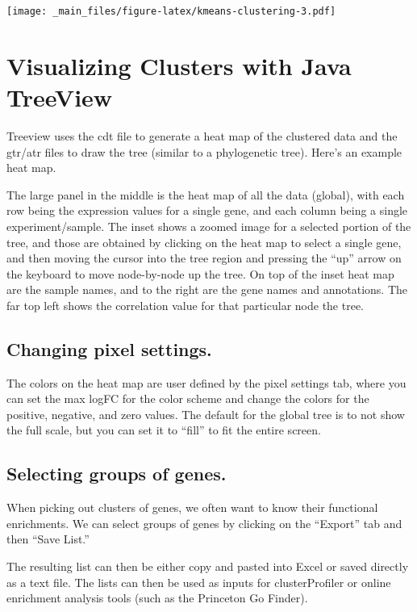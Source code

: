 \documentclass[
]{book}
\begin{document}
\texttt{[image: \_main\_files/figure-latex/kmeans-clustering-3.pdf]}

\hypertarget{visualizing-clusters-with-java-treeview}{%
\section{Visualizing Clusters with Java TreeView}\label{visualizing-clusters-with-java-treeview}}

Treeview uses the cdt file to generate a heat map of the clustered data and the gtr/atr files to draw the tree (similar to a phylogenetic tree). Here's an example heat map.

The large panel in the middle is the heat map of all the data (global), with each row being the expression values for a single gene, and each column being a single experiment/sample. The inset shows a zoomed image for a selected portion of the tree, and those are obtained by clicking on the heat map to select a single gene, and then moving the cursor into the tree region and pressing the ``up'' arrow on the keyboard to move node-by-node up the tree. On top of the inset heat map are the sample names, and to the right are the gene names and annotations. The far top left shows the correlation value for that particular node the tree.

\hypertarget{changing-pixel-settings.}{%
\subsection{Changing pixel settings.}\label{changing-pixel-settings.}}

The colors on the heat map are user defined by the pixel settings tab, where you can set the max logFC for the color scheme and change the colors for the positive, negative, and zero values. The default for the global tree is to not show the full scale, but you can set it to ``fill'' to fit the entire screen.

\hypertarget{selecting-groups-of-genes.}{%
\subsection{Selecting groups of genes.}\label{selecting-groups-of-genes.}}

When picking out clusters of genes, we often want to know their functional enrichments. We can select groups of genes by clicking on the ``Export'' tab and then ``Save List.''

The resulting list can then be either copy and pasted into Excel or saved directly as a text file. The lists can then be used as inputs for clusterProfiler or online enrichment analysis tools (such as the Princeton Go Finder).
\end{document}
